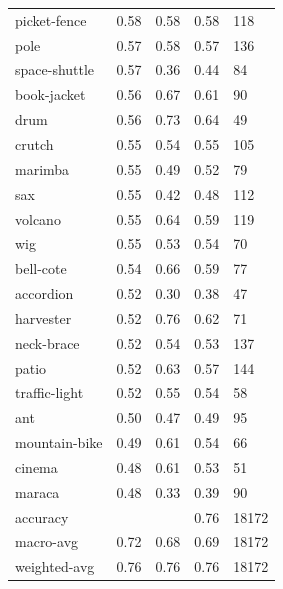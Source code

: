 \begin{center}
\begin{longtable}{lllll}
picket-fence & 0.58 & 0.58 & 0.58 & 118 \\
pole & 0.57 & 0.58 & 0.57 & 136 \\
space-shuttle & 0.57 & 0.36 & 0.44 & 84 \\
book-jacket & 0.56 & 0.67 & 0.61 & 90 \\
drum & 0.56 & 0.73 & 0.64 & 49 \\
crutch & 0.55 & 0.54 & 0.55 & 105 \\
marimba & 0.55 & 0.49 & 0.52 & 79 \\
sax & 0.55 & 0.42 & 0.48 & 112 \\
volcano & 0.55 & 0.64 & 0.59 & 119 \\
wig & 0.55 & 0.53 & 0.54 & 70 \\
bell-cote & 0.54 & 0.66 & 0.59 & 77 \\
accordion & 0.52 & 0.30 & 0.38 & 47 \\
harvester & 0.52 & 0.76 & 0.62 & 71 \\
neck-brace & 0.52 & 0.54 & 0.53 & 137 \\
patio & 0.52 & 0.63 & 0.57 & 144 \\
traffic-light & 0.52 & 0.55 & 0.54 & 58 \\
ant & 0.50 & 0.47 & 0.49 & 95 \\
mountain-bike & 0.49 & 0.61 & 0.54 & 66 \\
cinema & 0.48 & 0.61 & 0.53 & 51 \\
maraca & 0.48 & 0.33 & 0.39 & 90 \\
\midrule
accuracy &  &  & 0.76 & 18172 \\
macro-avg & 0.72 & 0.68 & 0.69 & 18172 \\
weighted-avg & 0.76 & 0.76 & 0.76 & 18172 \\
\bottomrule
\end{longtable}
\end{center}

